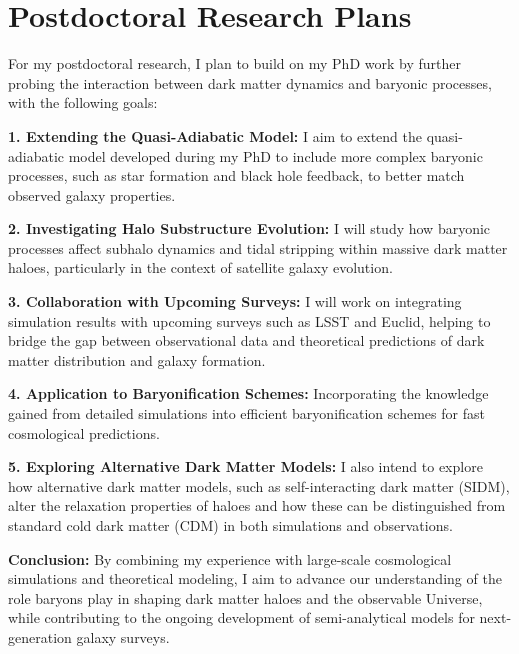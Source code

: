\documentclass[11pt]{article}
\begin{document}
\section*{Postdoctoral Research Plans}

For my postdoctoral research, I plan to build on my PhD work by further probing the interaction between dark matter dynamics and baryonic processes, with the following goals:

\textbf{1. Extending the Quasi-Adiabatic Model:}  
I aim to extend the quasi-adiabatic model developed during my PhD to include more complex baryonic processes, such as star formation and black hole feedback, to better match observed galaxy properties.

\textbf{2. Investigating Halo Substructure Evolution:}  
I will study how baryonic processes affect subhalo dynamics and tidal stripping within massive dark matter haloes, particularly in the context of satellite galaxy evolution.

\textbf{3. Collaboration with Upcoming Surveys:}  
I will work on integrating simulation results with upcoming surveys such as LSST and Euclid, helping to bridge the gap between observational data and theoretical predictions of dark matter distribution and galaxy formation.

\textbf{4. Application to Baryonification Schemes:}  
Incorporating the knowledge gained from detailed simulations into efficient baryonification schemes for fast cosmological predictions.

\textbf{5. Exploring Alternative Dark Matter Models:}  
I also intend to explore how alternative dark matter models, such as self-interacting dark matter (SIDM), alter the relaxation properties of haloes and how these can be distinguished from standard cold dark matter (CDM) in both simulations and observations.

\textbf{Conclusion:}  
By combining my experience with large-scale cosmological simulations and theoretical modeling, I aim to advance our understanding of the role baryons play in shaping dark matter haloes and the observable Universe, while contributing to the ongoing development of semi-analytical models for next-generation galaxy surveys.
\end{document}
